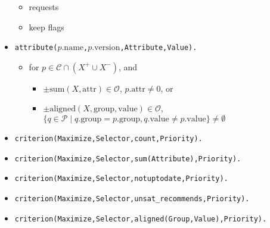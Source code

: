 \documentclass[a4paper,english]{article}
\begin{document}
\begin{itemize}
\begin{itemize}
      \item requests
      \item keep flags
    \end{itemize}
  \item \texttt{attribute($p.\mathrm{name}$,$p.\mathrm{version}$,Attribute,Value).}
    \begin{itemize}
      \item for $p\in\mathcal{C}\cap(X^{+}\cup X^{-})$, and
        \begin{itemize}
          \item $\pm\mathrm{sum}(X,\mathrm{attr})\in\mathcal{O}$, $p.\mathrm{attr}\not=0$, or
          \item $\pm\mathrm{aligned}(X,\mathrm{group},\mathrm{value})\in\mathcal{O}$, $\{q\in \mathcal{P} \mid q.\mathrm{group} = p.\mathrm{group}, q.\mathrm{value} \neq p.\mathrm{value}\}\not=\emptyset$
        \end{itemize}
    \end{itemize}
  \item \texttt{criterion(Maximize,Selector,count,Priority).}
  \item \texttt{criterion(Maximize,Selector,sum(Attribute),Priority).}
  \item \texttt{criterion(Maximize,Selector,notuptodate,Priority).}
  \item \texttt{criterion(Maximize,Selector,unsat\_recommends,Priority).}
  \item \texttt{criterion(Maximize,Selector,aligned(Group,Value),Priority).}
\end{itemize}
\end{document}
